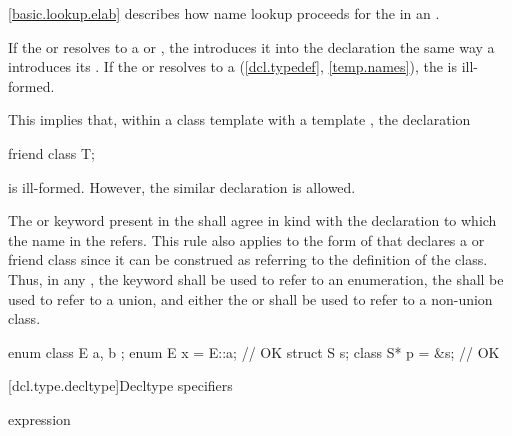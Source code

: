 \pnum
\begin{note}
\ref{basic.lookup.elab} describes how name lookup proceeds for the
 in an .
\end{note}
If the  or 
resolves to a  or
, the 
introduces it into the declaration the same way a
 introduces
its .
If the  or  resolves to a
 (\ref{dcl.typedef}, \ref{temp.names}),
the  is ill-formed.
\begin{note}
This implies that, within a class template with a template
 , the declaration
\begin{codeblock}
friend class T;
\end{codeblock}
is ill-formed. However, the similar declaration  is allowed.
\end{note}

\pnum
The  or  keyword
present in the
 shall agree in kind with the
declaration to which the name in the
 refers. This rule also applies to
the form of  that declares a
 or friend class since it can be construed
as referring to the definition of the class. Thus, in any
, the  keyword
shall be
used to refer to an enumeration, the 
 shall be used to refer to a union,
and either the  or 
 shall be used to refer to a non-union class.
\begin{example}
\begin{codeblock}
enum class E { a, b };
enum E x = E::a;                // OK
struct S { } s;
class S* p = &s;                // OK
\end{codeblock}
\end{example}

[dcl.type.decltype]{Decltype specifiers}%
%

\begin{bnf}
\br
   \terminal{(} expression \terminal{)}
\end{bnf}

